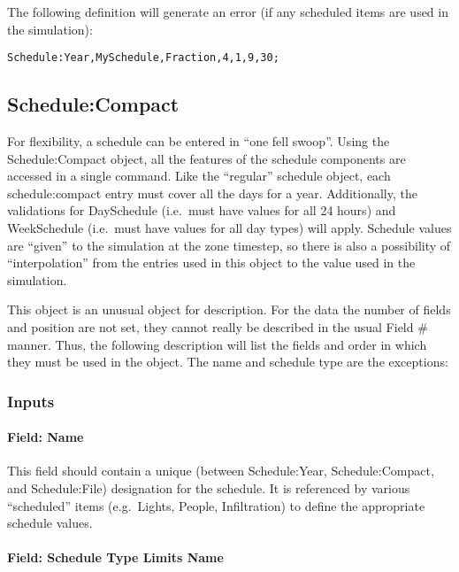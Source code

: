 The following definition will generate an error (if any scheduled items are used in the simulation):

\begin{lstlisting}
Schedule:Year,MySchedule,Fraction,4,1,9,30;
\end{lstlisting}

\subsection{Schedule:Compact}\label{schedulecompact}

For flexibility, a schedule can be entered in ``one fell swoop''. Using the Schedule:Compact object, all the features of the schedule components are accessed in a single command. Like the ``regular'' schedule object, each schedule:compact entry must cover all the days for a year. Additionally, the validations for DaySchedule (i.e.~must have values for all 24 hours) and WeekSchedule (i.e.~must have values for all day types) will apply. Schedule values are ``given'' to the simulation at the zone timestep, so there is also a possibility of ``interpolation'' from the entries used in this object to the value used in the simulation.

This object is an unusual object for description. For the data the number of fields and position are not set, they cannot really be described in the usual Field \# manner. Thus, the following description will list the fields and order in which they must be used in the object. The name and schedule type are the exceptions:

\subsubsection{Inputs}\label{inputs-7-023}

\paragraph{Field: Name}\label{field-name-6-019}

This field should contain a unique (between Schedule:Year, Schedule:Compact, and Schedule:File) designation for the schedule. It is referenced by various ``scheduled'' items (e.g.~Lights, People, Infiltration) to define the appropriate schedule values.

\paragraph{Field: Schedule Type Limits Name}\label{field-schedule-type-limits-name-4}

